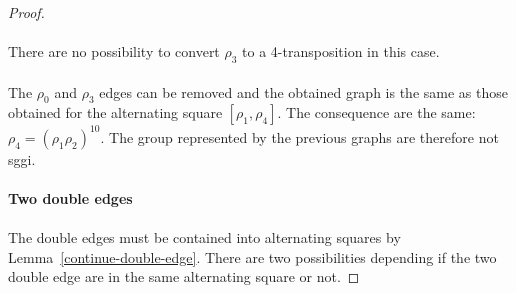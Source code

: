 \begin{proof}
\begin{figure}[H]
\begin{center}
    \caption{}
  \end{center}
\end{figure}

\paragraph{}
There are no possibility to convert $\rho_3$ to a 4-transposition in this case.

\paragraph{}
The $\rho_0$ and $\rho_3$ edges can be removed and the obtained graph is the same as those obtained for the alternating square $[\rho_1,\rho_4]$. The consequence are the same: $\rho_4 = (\rho_1\rho_2)^{10}$. The group represented by the previous graphs are therefore not sggi.

\paragraph{}
\textbf{Two double edges}

\paragraph{}
The double edges must be contained into alternating squares by Lemma~\ref{continue-double-edge}. There are two possibilities depending if the two double edge are in the same alternating square or not.


\end{proof}
